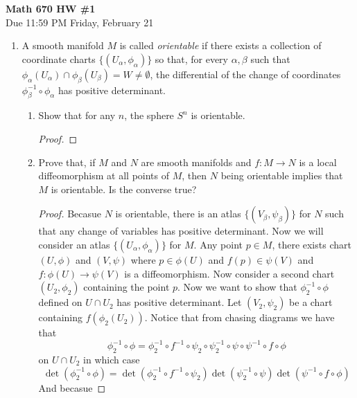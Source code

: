 \documentclass[11pt]{article}
\theoremstyle{definition}
\theoremstyle{definition}
\begin{document}
\begin{center}
{\Large\textbf{Math 670 HW \#1}}\\
Due 11:59 PM Friday, February 21
\end{center}




\begin{enumerate}	
	
	\item A smooth manifold $M$ is called \emph{orientable} if there exists a collection of coordinate charts $\{(U_\alpha, \phi_\alpha)\}$ so that, for every $\alpha, \beta$ such that $\phi_\alpha(U_\alpha) \cap \phi_\beta(U_\beta) = W \neq \emptyset$, the differential of the change of coordinates $\phi_\beta^{-1} \circ \phi_\alpha$ has positive determinant.
	
	\begin{enumerate}
		\item Show that for any $n$, the sphere $S^n$ is orientable.
		\begin{proof}
            
        \end{proof}		
		\item Prove that, if $M$ and $N$ are smooth manifolds and $f: M \to N$ is a local diffeomorphism at all points of $M$, then $N$ being orientable implies that $M$ is orientable. Is the converse true?
        \begin{proof}
            Becasue $N$ is orientable, there is an atlas $\{(V_\beta,\psi_\beta)\}$ for $N$ such that any change of variables has positive determinant. 
            Now we will consider an atlas $\{(U_\alpha,\phi_\alpha)\}$ for $M$.
            Any point $p\in M$, there exists chart $(U,\phi)$ and $(V,\psi)$ where $p\in\phi(U)$ and $f(p)\in\psi(V)$ and $f:\phi(U)\rightarrow\psi(V)$ is a diffeomorphism.
            Now consider a second chart $(U_2,\phi_2)$ containing the point $p$. Now we want to show that $\phi_2^{-1}\circ\phi$ defined on $U\cap U_2$ 
            has positive determinant. Let $(V_2,\psi_2)$ be a chart containing $f(\phi_2(U_2))$. Notice that from chasing diagrams we have that 
            \[\phi_2^{-1}\circ\phi=\phi_2^{-1}\circ f^{-1} \circ \psi_2\circ\psi_2^{-1}\circ\psi\circ\psi^{-1}\circ f \circ\phi\]
            on $U\cap U_2$ in which case 
            \[\det(\phi_2^{-1}\circ\phi)=\det(\phi_2^{-1}\circ f^{-1} \circ \psi_2)\det(\psi_2^{-1}\circ\psi)\det(\psi^{-1}\circ f \circ\phi)\]
            And becasue 





\end{proof}
\end{enumerate}
\end{enumerate}
\end{document}
